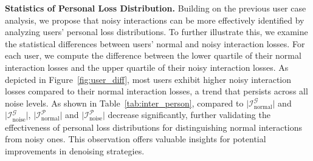 \textbf{Statistics of Personal Loss Distribution.} Building on the previous user case analysis, we propose that noisy interactions can be more effectively identified by analyzing users' personal loss distributions. To further illustrate this, we examine the statistical differences between users' normal and noisy interaction losses. For each user, we compute the difference between the lower quartile of their normal interaction losses and the upper quartile of their noisy interaction losses. As depicted in Figure~\ref{fig:user_diff}, most users exhibit higher noisy interaction losses compared to their normal interaction losses, a trend that persists across all noise levels. As shown in Table~\ref{tab:inter_person}, compared to $\vert \mathcal{I}^{\mathcal{G}}_{\text{normal}} \vert$ and $\vert \mathcal{I}^{\mathcal{G}}_{\text{noise}} \vert$, $\vert \mathcal{I}^{\mathcal{P}}_{\text{normal}} \vert$ and $\vert \mathcal{I}^{\mathcal{P}}_{\text{noise}} \vert$ decrease significantly, further validating the effectiveness of personal loss distributions for distinguishing normal interactions from noisy ones. This observation offers valuable insights for potential improvements in denoising strategies.


